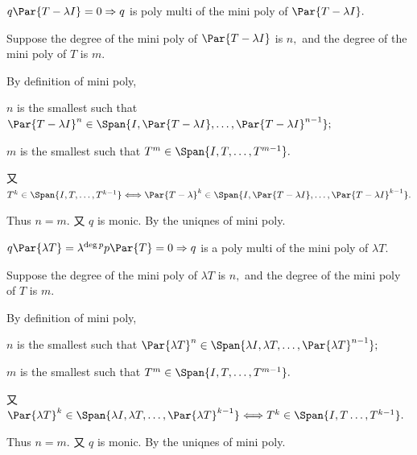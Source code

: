 \par\quad
$q\Par{T-\lambda I}=0\Rightarrow q$ is poly multi of the mini poly of $\Par{T-\lambda I}.$\par\quad
Suppose the degree of the mini poly of $\Par{T-\lambda I}$ is $n,$ and the degree of the mini poly of $T$ is $m.$\par\quad
By definition of mini poly,\par\quad
$n$ is the smallest such that $\Par{T-\lambda I}^n\in\Span{I,\Par{T-\lambda I},\dots,\Par{T-\lambda I}^{n-1}};$\par\quad
$m$ is the smallest such that $T^m\in\Span{I,T,\dots,T^{m-1}}.$\par\quad
又 $T^k\in\Span{I,T,\dots,T^{k-1}}\Longleftrightarrow \Par{T-\lambda}^k\in\Span{I,\Par{T-\lambda I},\dots,\Par{T-\lambda I}^{k-1}}.$\par\quad
Thus $n=m.$ 又 $q$ is monic. By the uniqnes of mini poly.\PfEnd
\SepLine

\par\quad
$q\Par{\lambda T}=\lambda^{\deg p}p\Par{T}=0\Rightarrow q$ is a poly multi of the mini poly of $\lambda T.$\par\quad
Suppose the degree of the mini poly of $\lambda T$ is $n,$ and the degree of the mini poly of $T$ is $m.$\par\quad
By definition of mini poly,\par\quad
$n$ is the smallest such that $\Par{\lambda T}^n\in\Span{\lambda I,\lambda T,\dots,\Par{\lambda T}^{n-1}};$\par\quad
$m$ is the smallest such that $T^m\in\Span{I,T,\dots,T^{m-1}}.$\par\quad
又 $\Par{\lambda T}^k\in\Span{\lambda I,\lambda T,\dots,\Par{\lambda T}^{k-1}}\Longleftrightarrow T^k\in\Span{I,T\dots,T^{k-1}}.$\par\quad
Thus $n=m.$ 又 $q$ is monic. By the uniqnes of mini poly.\PfEnd
\SepLine

